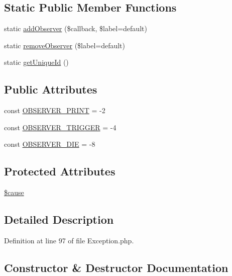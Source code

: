 \subsection*{Static Public Member Functions}
\begin{DoxyCompactItemize}
\item 
static \hyperlink{classPEAR__Exception_acedbec58339dbeacc5bcfeaa6dbc44b7}{add\+Observer} (\$callback, \$label=\textquotesingle{}default\textquotesingle{})
\item 
static \hyperlink{classPEAR__Exception_ac5a5c181030c19d81f280ab8190b5909}{remove\+Observer} (\$label=\textquotesingle{}default\textquotesingle{})
\item 
static \hyperlink{classPEAR__Exception_af81b4e556fe7142e45ed9117b8cfb044}{get\+Unique\+Id} ()
\end{DoxyCompactItemize}
\subsection*{Public Attributes}
\begin{DoxyCompactItemize}
\item 
const \hyperlink{classPEAR__Exception_afaa71d35f3fab453da2cef325b210423}{O\+B\+S\+E\+R\+V\+E\+R\+\_\+\+P\+R\+I\+NT} = -\/2
\item 
const \hyperlink{classPEAR__Exception_a0bf6d43a80c7f3bc2c7cfae062ff4477}{O\+B\+S\+E\+R\+V\+E\+R\+\_\+\+T\+R\+I\+G\+G\+ER} = -\/4
\item 
const \hyperlink{classPEAR__Exception_ad3ee7214450c1e14de99dbde12b8a60c}{O\+B\+S\+E\+R\+V\+E\+R\+\_\+\+D\+IE} = -\/8
\end{DoxyCompactItemize}
\subsection*{Protected Attributes}
\begin{DoxyCompactItemize}
\item 
\hyperlink{classPEAR__Exception_a7570906af734c282bcde649449bdbfdb}{\$cause}
\end{DoxyCompactItemize}


\subsection{Detailed Description}


Definition at line 97 of file Exception.\+php.



\subsection{Constructor \& Destructor Documentation}
\mbox{\label{classPEAR__Exception_a7cecb146f11821bcd31ef8317c9a2ce9}} 
